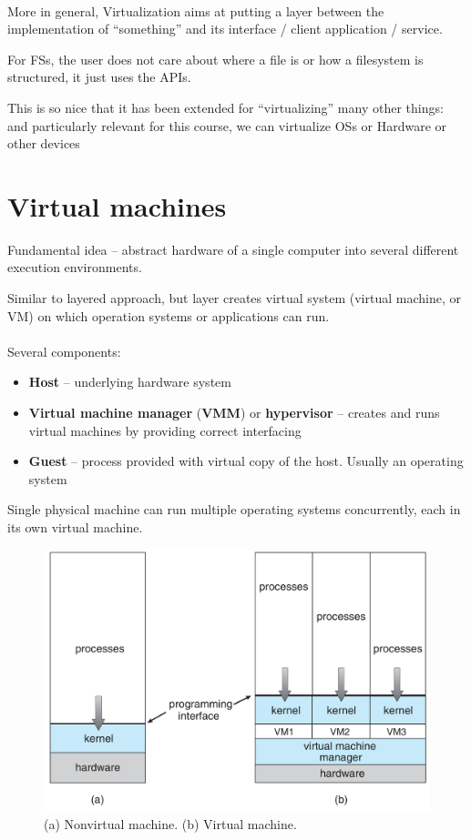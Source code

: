 \paragraph{}

More in general, Virtualization aims at putting a layer between the
implementation of “something” and its interface / client application /
service.

For FSs, the user does not care about where a file is or how a filesystem is structured, it just uses the APIs. 

This is so nice that it has been extended for “virtualizing” many other
things: and particularly relevant for this course, we can virtualize OSs or Hardware or other devices

\section{Virtual machines}
Fundamental idea – abstract hardware of a single computer into
several different execution environments.

Similar to layered approach, but layer creates virtual system (virtual machine, or VM) on
which operation systems or applications can run.

\paragraph{}

Several components:

\begin{itemize}
    \item \textbf{Host} – underlying hardware system
    \item \textbf{Virtual machine manager} (\textbf{VMM}) or \textbf{hypervisor} – creates and runs virtual machines by providing correct interfacing
    \item \textbf{Guest} – process provided with virtual copy of the host. Usually an operating system
\end{itemize}

Single physical machine can run multiple operating systems concurrently, each in its own virtual machine.

\begin{figure}[h!]
    \centering
    \includegraphics[width=0.55\linewidth]{img/ndfzgdgzfng.png}
    \caption{ (a) Nonvirtual machine. (b) Virtual machine.}
\end{figure}


